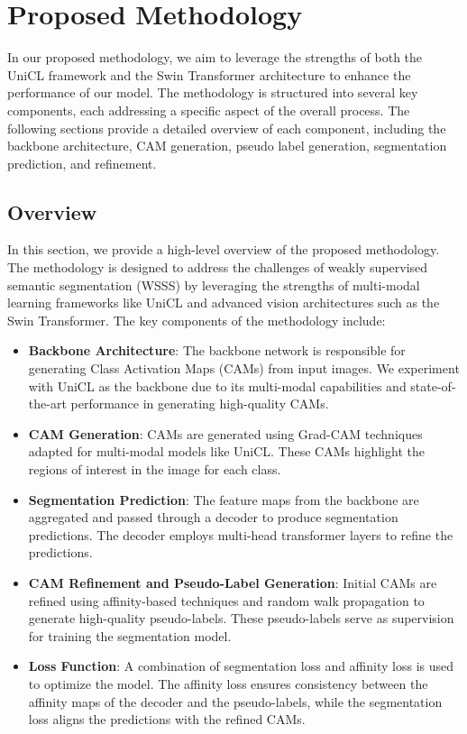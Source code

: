\chapter{Proposed Methodology}
\label{chap:methodology}

In our proposed methodology, we aim to leverage the strengths of both the UniCL framework and the Swin Transformer architecture to enhance the performance of our model. The methodology is structured into several key components, each addressing a specific aspect of the overall process. The following sections provide a detailed overview of each component, including the backbone architecture, CAM generation, pseudo label generation, segmentation prediction, and refinement.

\section{Overview}
\label{sec:overview}
In this section, we provide a high-level overview of the proposed methodology. The methodology is designed to address the challenges of weakly supervised semantic segmentation (WSSS) by leveraging the strengths of multi-modal learning frameworks like UniCL and advanced vision architectures such as the Swin Transformer. The key components of the methodology include:

\begin{itemize}
    \item \textbf{Backbone Architecture}: The backbone network is responsible for generating Class Activation Maps (CAMs) from input images. We experiment with UniCL as the backbone due to its multi-modal capabilities and state-of-the-art performance in generating high-quality CAMs.
    \item \textbf{CAM Generation}: CAMs are generated using Grad-CAM techniques adapted for multi-modal models like UniCL. These CAMs highlight the regions of interest in the image for each class.
    \item \textbf{Segmentation Prediction}: The feature maps from the backbone are aggregated and passed through a decoder to produce segmentation predictions. The decoder employs multi-head transformer layers to refine the predictions.
    \item \textbf{CAM Refinement and Pseudo-Label Generation}: Initial CAMs are refined using affinity-based techniques and random walk propagation to generate high-quality pseudo-labels. These pseudo-labels serve as supervision for training the segmentation model.
    \item \textbf{Loss Function}: A combination of segmentation loss and affinity loss is used to optimize the model. The affinity loss ensures consistency between the affinity maps of the decoder and the pseudo-labels, while the segmentation loss aligns the predictions with the refined CAMs.
\end{itemize}

